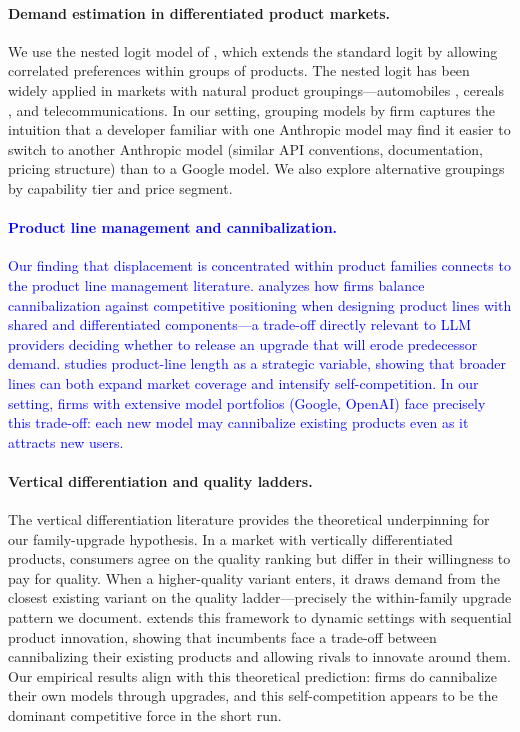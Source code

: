 \documentclass[11pt, a4paper]{article}
\begin{document}
\paragraph{Demand estimation in differentiated product markets.} We use the nested logit model of \citet{berry1994estimating}, which extends the standard logit by allowing correlated preferences within groups of products. The nested logit has been widely applied in markets with natural product groupings---automobiles \citep{berry1995automobile}, cereals \citep{nevo2000practitioners}, and telecommunications. In our setting, grouping models by firm captures the intuition that a developer familiar with one Anthropic model may find it easier to switch to another Anthropic model (similar API conventions, documentation, pricing structure) than to a Google model. We also explore alternative groupings by capability tier and price segment.

\textcolor{blue}{\paragraph{Product line management and cannibalization.} Our finding that displacement is concentrated within product families connects to the product line management literature. \citet{desai2001product} analyzes how firms balance cannibalization against competitive positioning when designing product lines with shared and differentiated components---a trade-off directly relevant to LLM providers deciding whether to release an upgrade that will erode predecessor demand. \citet{draganska2005product} studies product-line length as a strategic variable, showing that broader lines can both expand market coverage and intensify self-competition. In our setting, firms with extensive model portfolios (Google, OpenAI) face precisely this trade-off: each new model may cannibalize existing products even as it attracts new users.}

\paragraph{Vertical differentiation and quality ladders.} The vertical differentiation literature \citep{shaked1982relaxing, tirole1988theory} provides the theoretical underpinning for our family-upgrade hypothesis. In a market with vertically differentiated products, consumers agree on the quality ranking but differ in their willingness to pay for quality. When a higher-quality variant enters, it draws demand from the closest existing variant on the quality ladder---precisely the within-family upgrade pattern we document. \citet{baron2020vertical} extends this framework to dynamic settings with sequential product innovation, showing that incumbents face a trade-off between cannibalizing their existing products and allowing rivals to innovate around them. Our empirical results align with this theoretical prediction: firms do cannibalize their own models through upgrades, and this self-competition appears to be the dominant competitive force in the short run.
\end{document}
